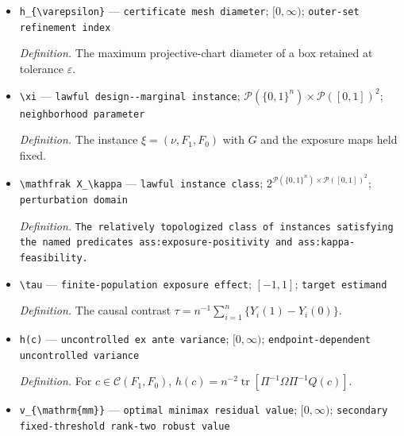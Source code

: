 \documentclass{article}
\begin{document}
\begin{itemize}
  \par\smallskip\noindent\emph{Definition.} \texttt{An exact rational or real-\allowbreak{}algebraic encoding,\allowbreak{} or certified inclusion-\allowbreak{}oracle encoding with effective refinement moduli and exact feasibility decisions,\allowbreak{} of the known design matrices,\allowbreak{} both endpoint moment matrices,\allowbreak{} endpoint covariances,\allowbreak{} regularity threshold,\allowbreak{} and tolerance.}
  \item \texttt{h\_\allowbreak{}\{\textbackslash{}\allowbreak{}varepsilon\}\allowbreak{}} --- \texttt{certificate mesh diameter}; \([0,\infty)\); \texttt{outer-\allowbreak{}set refinement index}
  \par\smallskip\noindent\emph{Definition.} The maximum projective-chart diameter of a box retained at tolerance \(\varepsilon\).
  \item \texttt{\textbackslash{}\allowbreak{}xi} --- \texttt{lawful design-\allowbreak{}-\allowbreak{}marginal instance}; \(\mathcal P(\{0,1\}^n)\times\mathcal P([0,1])^2\); \texttt{neighborhood parameter}
  \par\smallskip\noindent\emph{Definition.} The instance \(\xi=(\nu,F_1,F_0)\) with \(G\) and the exposure maps held fixed.
  \item \texttt{\textbackslash{}\allowbreak{}mathfrak X\_\allowbreak{}\textbackslash{}\allowbreak{}kappa} --- \texttt{lawful instance class}; \(2^{\mathcal P(\{0,1\}^n)\times\mathcal P([0,1])^2}\); \texttt{perturbation domain}
  \par\smallskip\noindent\emph{Definition.} \texttt{The relatively topologized class of instances satisfying the named predicates ass:\allowbreak{}exposure-\allowbreak{}positivity and ass:\allowbreak{}kappa-\allowbreak{}feasibility.}
  \item \texttt{\textbackslash{}\allowbreak{}tau} --- \texttt{finite-\allowbreak{}population exposure effect}; \([-1,1]\); \texttt{target estimand}
  \par\smallskip\noindent\emph{Definition.} The causal contrast \(\tau=n^{-1}\sum_{i=1}^n\{Y_i(1)-Y_i(0)\}\).
  \item \texttt{h(c)} --- \texttt{uncontrolled ex ante variance}; \([0,\infty)\); \texttt{endpoint-\allowbreak{}dependent uncontrolled variance}
  \par\smallskip\noindent\emph{Definition.} For \(c\in\mathcal C(F_1,F_0)\), \(h(c)=n^{-2}\operatorname{tr}[\Pi^{-1}\Omega\Pi^{-1}Q(c)]\).
  \item \texttt{v\_\allowbreak{}\{\textbackslash{}\allowbreak{}mathrm\{mm\}\allowbreak{}\}\allowbreak{}} --- \texttt{optimal minimax residual value}; \([0,\infty)\); \texttt{secondary fixed-\allowbreak{}threshold rank-\allowbreak{}two robust value}

\end{itemize}
\end{document}
